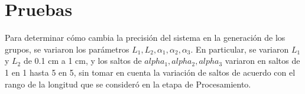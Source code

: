 \section{Pruebas}

Para determinar cómo cambia la precisión del sistema en la generación de los grupos, se variaron los parámetros $L_1, L_2, \alpha_1, \alpha_2, \alpha_3$. En particular, se variaron $L_1$ y $L_2$ de 0.1 cm a 1 cm, y los saltos de $alpha_1, alpha_2, alpha_3$ variaron en saltos de 1 en 1 hasta 5 en 5, sin tomar en cuenta la variación de saltos de acuerdo con el rango de la longitud que se consideró en la etapa de Procesamiento.